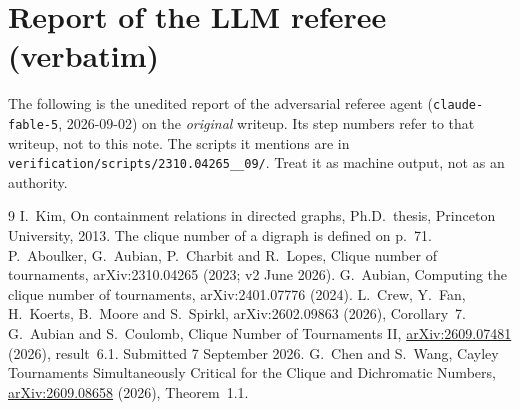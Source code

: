 \documentclass[11pt,a4paper]{article}
\theoremstyle{plain}
\theoremstyle{definition}
\theoremstyle{remark}
\begin{document}
\section{Report of the LLM referee (verbatim)}\label{app:referee}

\begin{tcolorbox}[colback=gray!8,colframe=gray!50,boxrule=0.4pt,arc=2pt]
\small The following is the unedited report of the adversarial referee agent (\texttt{claude-fable-5}, 2026-09-02) on the \emph{original} writeup. Its step numbers refer to that writeup, not to this note. The scripts it mentions are in \texttt{verification/scripts/2310.04265\_\_09/}. Treat it as machine output, not as an authority.
\end{tcolorbox}



\begin{thebibliography}{9}
\small
\setlength{\itemsep}{2pt}
 I.~Kim, On containment relations in directed graphs, Ph.D.\ thesis, Princeton University, 2013. The clique number of a digraph is defined on p.~71.
 P.~Aboulker, G.~Aubian, P.~Charbit and R.~Lopes, Clique number of tournaments, arXiv:2310.04265 (2023; v2 June 2026).
 G.~Aubian, Computing the clique number of tournaments, arXiv:2401.07776 (2024).
 L.~Crew, Y.~Fan, H.~Koerts, B.~Moore and S.~Spirkl, arXiv:2602.09863 (2026), Corollary~7.
 G.~Aubian and S.~Coulomb, Clique Number of Tournaments II, \href{https://arxiv.org/abs/2609.07481}{arXiv:2609.07481} (2026), result~6.1. Submitted 7 September 2026.
 G.~Chen and S.~Wang, Cayley Tournaments Simultaneously Critical for the Clique and Dichromatic Numbers, \href{https://arxiv.org/abs/2609.08658}{arXiv:2609.08658} (2026), Theorem~1.1.
\end{thebibliography}
\end{document}
